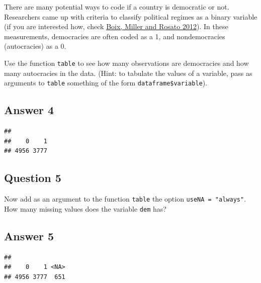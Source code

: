\documentclass[
  11pt,
  letterpaper]{article}
\newenvironment{Shaded}{\begin{snugshade}}{\end{snugshade}}
\newcommand{\AttributeTok}[1]{\textcolor[rgb]{0.13,0.29,0.53}{#1}}
\newcommand{\FunctionTok}[1]{\textcolor[rgb]{0.13,0.29,0.53}{\textbf{#1}}}
\newcommand{\NormalTok}[1]{#1}
\newcommand{\SpecialCharTok}[1]{\textcolor[rgb]{0.81,0.36,0.00}{\textbf{#1}}}
\newcommand{\StringTok}[1]{\textcolor[rgb]{0.31,0.60,0.02}{#1}}
\begin{document}
There are many potential ways to code if a country is democratic or not.
Researchers came up with criteria to classify political regimes as a
binary variable (if you are interested how, check
\href{https://journals.sagepub.com/doi/10.1177/0010414012463905}{Boix,
Miller and Rosato 2012}). In these measurements, democracies are often
coded as a 1, and nondemocracies (autocracies) as a 0.

Use the function \texttt{table} to see how many observations are
democracies and how many autocracies in the data. (Hint: to tabulate the
values of a variable, pass as arguments to \texttt{table} something of
the form \texttt{dataframe\$variable}).

\subsection{Answer 4}\label{answer-4}

\begin{Shaded}
\end{Shaded}

\begin{verbatim}
## 
##    0    1 
## 4956 3777
\end{verbatim}

\subsection{Question 5}\label{question-5}

Now add as an argument to the function \texttt{table} the option
\texttt{useNA\ =\ "always"}. How many missing values does the variable
\texttt{dem} has?

\subsection{Answer 5}\label{answer-5}

\begin{Shaded}
\end{Shaded}

\begin{verbatim}
## 
##    0    1 <NA> 
## 4956 3777  651
\end{verbatim}
\end{document}
